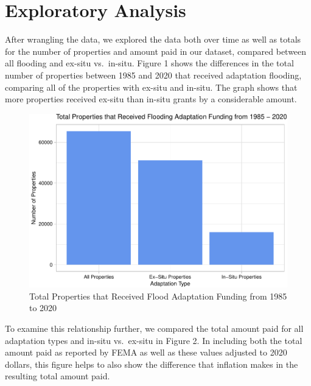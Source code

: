 \documentclass[
  12pt,
]{article}
\begin{document}
\newpage

\hypertarget{exploratory-analysis}{%
\section{Exploratory Analysis}\label{exploratory-analysis}}

After wrangling the data, we explored the data both over time as well as
totals for the number of properties and amount paid in our dataset,
compared between all flooding and ex-situ vs.~in-situ. Figure 1 shows
the differences in the total number of properties between 1985 and 2020
that received adaptation flooding, comparing all of the properties with
ex-situ and in-situ. The graph shows that more properties received
ex-situ than in-situ grants by a considerable amount.

\begin{figure}
\centering
\includegraphics{finalreport_files/figure-latex/unnamed-chunk-6-1.pdf}
\caption{Total Properties that Received Flood Adaptation Funding from
1985 to 2020}
\end{figure}

\newpage

To examine this relationship further, we compared the total amount paid
for all adaptation types and in-situ vs.~ex-situ in Figure 2. In
including both the total amount paid as reported by FEMA as well as
these values adjusted to 2020 dollars, this figure helps to also show
the difference that inflation makes in the resulting total amount paid.
\newline
\end{document}
